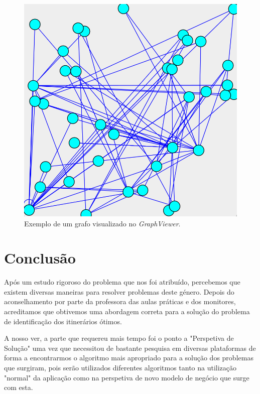 \documentclass[article, a4paper, 12pt, oneside]{memoir}
\begin{document}
\begin{figure}[h!]
  \centerline{\includegraphics[scale=0.6]{graphviewer.png}}
  \caption{Exemplo de um grafo visualizado no \textit{GraphViewer}.}
\end{figure}


\newpage
\chapter[Conclusão][Conclusão]{Conclusão} \label{\thechapter}

Após um estudo rigoroso do problema que nos foi atribuído, percebemos que existem diversas maneiras para resolver problemas deste género. Depois do aconselhamento por parte da professora das aulas práticas e dos monitores, acreditamos que obtivemos uma abordagem correta para a solução do problema de identificação dos itinerários ótimos.

A nosso ver, a parte que requereu mais tempo foi o ponto a "Perspetiva de Solução" uma vez que necessitou de bastante pesquisa em diversas plataformas de forma a encontrarmos o algoritmo mais apropriado para a solução dos problemas que surgiram, pois serão utilizados diferentes algoritmos tanto na utilização "normal" da aplicação como na perspetiva de novo modelo de negócio que surge com esta.
\end{document}
